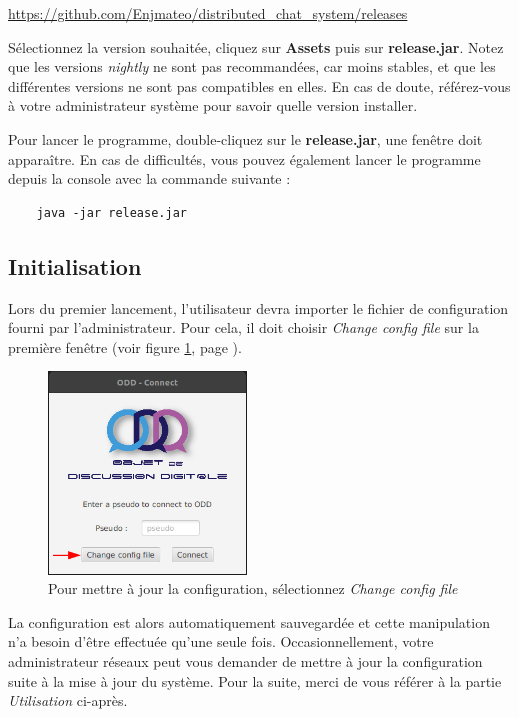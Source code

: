 \documentclass[12pt, a4paper]{article}
\begin{document}
    \begin{center}
        \url{https://github.com/Enjmateo/distributed_chat_system/releases}
    \end{center}
    
    Sélectionnez la version souhaitée, cliquez sur \textbf{Assets} puis sur \textbf{release.jar}. Notez que les versions \textit{nightly} ne sont pas recommandées, car moins stables, et que les différentes versions ne sont pas compatibles en elles. En cas de doute, référez-vous à votre administrateur système pour savoir quelle version installer.
    
    Pour lancer le programme, double-cliquez sur le \textbf{release.jar}, une fenêtre doit apparaître. En cas de difficultés, vous pouvez également lancer le programme depuis la console avec la commande suivante :
    \begin{verbatim}
    java -jar release.jar
    \end{verbatim}
    \vspace{-10pt}

    \subsection{Initialisation}
    \label{config}
    Lors du premier lancement, l'utilisateur devra importer le fichier de configuration fourni par l'administrateur. Pour cela, il doit choisir \textit{Change config file} sur la première fenêtre (voir figure \ref{login1}, page \pageref{login1}).
    
    \begin{figure}[!htp]
        \centering
        \includegraphics[width=0.47\textwidth]{img/login1.png}
        \caption{Pour mettre à jour la configuration, sélectionnez \textit{Change config file}}
        \label{login1}
    \end{figure}
    
    La configuration est alors automatiquement sauvegardée et cette manipulation n'a besoin d'être effectuée qu'une seule fois. Occasionnellement, votre administrateur réseaux peut vous demander de mettre à jour la configuration suite à la mise à jour du système. Pour la suite, merci de vous référer à la partie \textit{Utilisation} ci-après.
    
\end{document}

